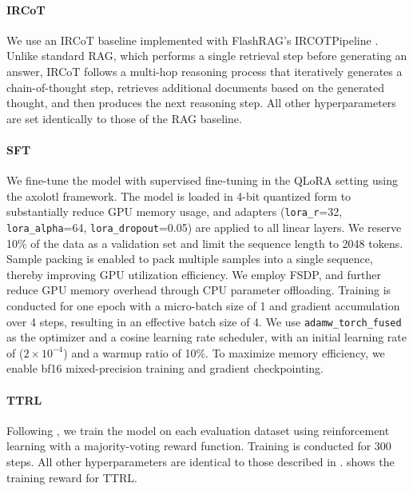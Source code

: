 \paragraph{IRCoT}
We use an IRCoT \citep{ircot} baseline implemented with FlashRAG's IRCOTPipeline \citep{FlashRAG}. Unlike standard RAG, which performs a single retrieval step before generating an answer, IRCoT follows a multi-hop reasoning process that iteratively generates a chain-of-thought step, retrieves additional documents based on the generated thought, and then produces the next reasoning step. All other hyperparameters are set identically to those of the RAG baseline.


\paragraph{SFT}
We fine-tune the model with supervised fine-tuning in the QLoRA setting using the axolotl \citep{axolotl} framework. The model is loaded in 4-bit quantized form to substantially reduce GPU memory usage, and adapters (\texttt{lora\_r}=32, \texttt{lora\_alpha}=64, \texttt{lora\_dropout}=0.05) are applied to all linear layers. We reserve 10\% of the data as a validation set and limit the sequence length to 2048 tokens. Sample packing is enabled to pack multiple samples into a single sequence, thereby improving GPU utilization efficiency. We employ FSDP, and further reduce GPU memory overhead through CPU parameter offloading. Training is conducted for one epoch with a micro-batch size of 1 and gradient accumulation over 4 steps, resulting in an effective batch size of 4. We use \texttt{adamw\_torch\_fused} as the optimizer and a cosine learning rate scheduler, with an initial learning rate of ($2\times10^{-4}$) and a warmup ratio of 10\%. To maximize memory efficiency, we enable bf16 mixed-precision training and gradient checkpointing.


\paragraph{TTRL}
Following \citet{ttrl}, we train the model on each evaluation dataset using reinforcement learning with a majority-voting reward function. Training is conducted for 300 steps. All other hyperparameters are identical to those described in .  shows the training reward for TTRL.



